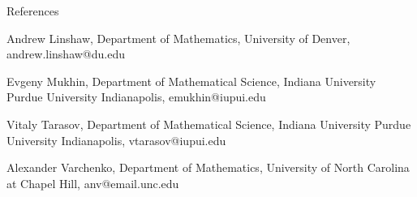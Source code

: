 \documentclass{resume} %
\begin{document}
\begin{rSection}{References}
\begin{rSubsection}{}{}
{}{}
  \item {Andrew Linshaw, Department of Mathematics, University of Denver, andrew.linshaw@du.edu}\\
  \item {Evgeny Mukhin, Department of Mathematical Science, Indiana University Purdue University Indianapolis, emukhin@iupui.edu}\\
  \item {Vitaly Tarasov, Department of Mathematical Science, Indiana University Purdue University Indianapolis, vtarasov@iupui.edu}\\
  \item {Alexander Varchenko, Department of Mathematics, University of North Carolina at Chapel Hill, anv@email.unc.edu}\\

\end{rSubsection}
\end{rSection}
\end{document}
